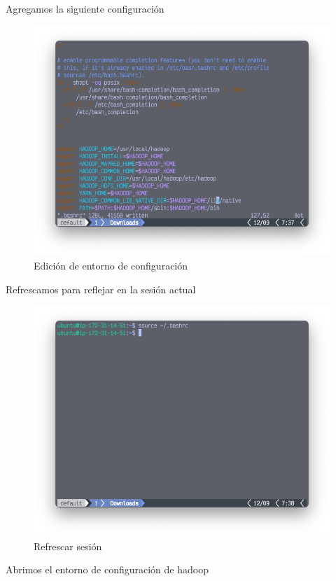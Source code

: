 Agregamos la siguiente configuración
\begin{figure}[h]
	\centering
	\includegraphics[scale=.35] {img/23-addToBashrc}
	\caption{Edición de entorno de configuración}
	\label{fig:23}	
\end{figure}
 Refrescamos para reflejar en la sesión actual
 \clearpage
\begin{figure}[h]
	\centering
	\includegraphics[scale=.35] {img/24-sourceBashrc}
	\caption{Refrescar sesión}
	\label{fig:24}	
\end{figure}

 Abrimos el entorno de configuración de hadoop

